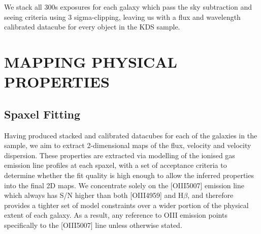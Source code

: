 \documentclass[a4paper,fleqn,usenatbib]{mn2e}
\begin{document}
We stack all 300s exposures for each galaxy which pass the sky subtraction and seeing criteria using 3 sigma-clipping, leaving us with a flux and wavelength calibrated datacube for every object in the KDS sample.

\section{MAPPING PHYSICAL PROPERTIES}\label{sec:extracting_properties}
\subsection{Spaxel Fitting}
Having produced stacked and calibrated datacubes for each of the galaxies in the sample, we aim to extract 2-dimensional maps of the flux, velocity and velocity dispersion.
These properties are extracted via modelling of the ionised gas emission line profiles at each spaxel, with a set of acceptance criteria to determine whether the fit quality is high enough to allow the inferred properties into the final 2D maps.
We concentrate solely on the [OIII5007] emission line which always has S/N higher than both [OIII4959] and H$\beta$, and therefore provides a tighter set of model constraints over a wider portion of the physical extent of each galaxy.
As a result, any reference to OIII emission points specifically to the [OIII5007] line unless otherwise stated.
\end{document}
